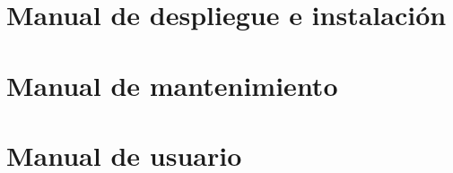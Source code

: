 
\section{Manual de despliegue e instalación} 


\section{Manual de mantenimiento}



\section{Manual de usuario}

